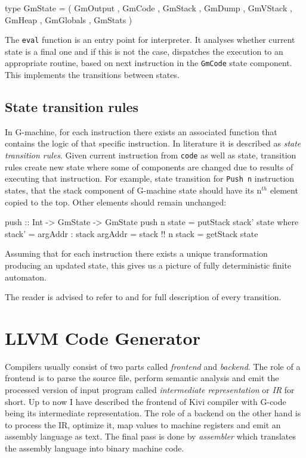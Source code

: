 \documentclass[12pt,a4paper]{report}
\begin{document}
\vspace*{0.2in}
\begin{code}[style=haskell]
type GmState = ( GmOutput
               , GmCode
               , GmStack
               , GmDump
               , GmVStack
               , GmHeap
               , GmGlobals
               , GmStats )
\end{code}

The \texttt{eval} function is an entry point for interpreter. It analyses
whether current state is a final one and if this is not the case, dispatches
the execution to an appropriate routine, based on next instruction in the
\texttt{GmCode} state component. This implements the transitions between states.

\subsection{State transition rules}
In G-machine, for each instruction there exists an associated function that
contains the logic of that specific instruction. In literature it is described
as \textit{state transition rules}. Given current instruction from
\texttt{code} as well as state, transition rules create new state where some of
components are changed due to results of executing that instruction. For
example, state transition for \texttt{Push n} instruction states, that the
stack component of G-machine state should have its n$^{th}$ element copied to
the top. Other elements should remain unchanged:

\vspace*{0.2in}
\begin{code}[style=haskell]
push :: Int -> GmState -> GmState
push n state =
    putStack stack' state
    where
        stack' = argAddr : stack
        argAddr = stack !! n
        stack = getStack state
\end{code}

Assuming that for each
instruction there exists a unique transformation producing an updated state,
this gives us a picture of fully deterministic finite automaton.

The reader is advised to refer to \cite{Jon87} and \cite{JonLes00} for full
description of every transition.

\section{LLVM Code Generator}
\label{sec:llvm_codegen}
Compilers usually consist of two parts called \textit{frontend} and
\textit{backend}. The role of a frontend is to parse the source file, perform
semantic analysis and emit the processed version of input program called
\textit{intermediate representation} or \textit{IR} for short. Up to now I have
described the frontend of Kivi compiler with G-code being its intermediate
representation. The role of a backend on the other hand is to process the IR,
optimize it, map values to machine registers and emit an assembly language as
text. The final pass is done by \textit{assembler} which translates the
assembly language into binary machine code.
\end{document}
